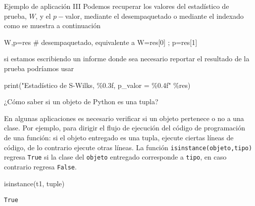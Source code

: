 \documentclass[
  ignorenonframetext,
  aspectratio=169,
  spanish,
]{beamer}
\newenvironment{Shaded}{\begin{snugshade}}{\end{snugshade}}
\newcommand{\BuiltInTok}[1]{\textcolor[rgb]{0.00,0.23,0.31}{#1}}
\newcommand{\CommentTok}[1]{\textcolor[rgb]{0.37,0.37,0.37}{#1}}
\newcommand{\NormalTok}[1]{\textcolor[rgb]{0.00,0.23,0.31}{#1}}
\newcommand{\OperatorTok}[1]{\textcolor[rgb]{0.37,0.37,0.37}{#1}}
\newcommand{\SpecialCharTok}[1]{\textcolor[rgb]{0.37,0.37,0.37}{#1}}
\newcommand{\StringTok}[1]{\textcolor[rgb]{0.13,0.47,0.30}{#1}}
\begin{document}
\begin{frame}[fragile]{Ejemplo de aplicación III}
\label{ejemplo-de-aplicaciuxf3n-iii}
Podemos recuperar los valores del estadístico de prueba, \(W\), y el
\(p-\)valor, mediante el desempaquetado o mediante el indexado como se
muestra a continuación

\begin{Shaded}
\begin{Highlighting}[]
\NormalTok{W,p}\OperatorTok{=}\NormalTok{res  }\CommentTok{\# desempaquetado, equivalente a W=res[0] ; p=res[1]}
\end{Highlighting}
\end{Shaded}

si estamos escribiendo un informe donde sea necesario reportar el
resultado de la prueba podríamos usar

\begin{Shaded}
\begin{Highlighting}[]
\BuiltInTok{print}\NormalTok{(}\StringTok{"Estadístico de S{-}Wilks, }\SpecialCharTok{\%0.3f}\StringTok{, p\_valor = }\SpecialCharTok{\%0.4f}\StringTok{"} \OperatorTok{\%}\NormalTok{res)}
\end{Highlighting}
\end{Shaded}
\end{frame}

\begin{frame}[fragile]{¿Cómo saber si un objeto de Python es una tupla?}
\label{cuxf3mo-saber-si-un-objeto-de-python-es-una-tupla}

En algunas aplicaciones es necesario verificar si un objeto pertenece o
no a una clase. Por ejemplo, para dirigir el flujo de ejecución del
código de programación de una función: si el objeto entregado es una
tupla, ejecute ciertas líneas de código, de lo contrario ejecute otras
líneas. La función \texttt{isinstance(objeto,tipo)} regresa
\texttt{True} si la clase del \texttt{objeto} entregado corresponde a
\texttt{tipo}, en caso contrario regresa \texttt{False}.

\begin{Shaded}
\begin{Highlighting}[]
\BuiltInTok{isinstance}\NormalTok{(t1, }\BuiltInTok{tuple}\NormalTok{)}
\end{Highlighting}
\end{Shaded}

\begin{verbatim}
True
\end{verbatim}
\end{frame}
\end{document}
